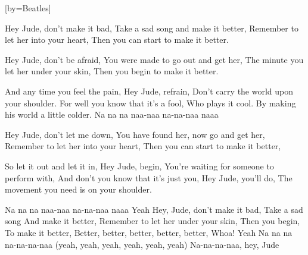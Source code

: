 


[by={Beatles}]



\beginverse
Hey Jude, don't make it bad, Take a sad song and make it better,
Remember to let her into your heart, Then you can start to make it better.
\endverse

\beginverse
Hey Jude, don't be afraid, You were made to go out and get her,
The minute you let her under your skin, Then you begin to make it better.
\endverse

\beginverse
And any time you feel the pain, Hey Jude, refrain,
Don't carry the world upon your shoulder.
For well you know that it's a fool, Who plays it cool.
By making his world a little colder.
Na na na naa-naa
na-na-naa naaa
\endverse

\beginverse
Hey Jude, don't let me down, You have found her, now go and get her,
Remember to let her into your heart, Then you can start to make it better,
\endverse

\beginverse
So let it out and let it in, Hey Jude, begin,
You're waiting for someone to perform with,
And don't you know that it's just you, Hey Jude, you'll do,
The movement you need is on your shoulder.
\endverse

\beginverse
Na na na naa-naa
na-na-naa naaa
Yeah
Hey, Jude, don't make it bad, Take a sad song And make it better,
Remember to let her under your skin, Then you begin,
To make it better, Better, better, better, better, better,
Whoa!
Yeah
Na na na na-na-na-naa (yeah, yeah, yeah, yeah, yeah, yeah)
Na-na-na-naa, hey, Jude
\endverse


\endsong

